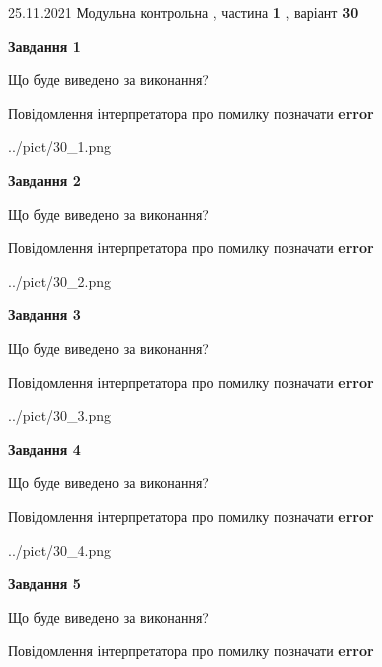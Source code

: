 \documentclass[10pt, ukrainian]{article}
\begin{document}
{25.11.2021 Модульна контрольна , частина \textbf { 1 }, варіант  \No \textbf { 30 }\par}
{
\begin {large}

{\begin {center}\textbf{Завдання 1}\end {center}}\par
Що буде виведено за виконання? \par
Повідомлення інтерпретатора про помилку позначати \textbf{error}

\begin{center}
	{../pict/30_1.png}
\end{center}
\newpage

{\begin {center}\textbf{Завдання 2}\end {center}}\par
Що буде виведено за виконання? \par
Повідомлення інтерпретатора про помилку позначати \textbf{error}

\begin{center}
	{../pict/30_2.png}
\end{center}
\newpage

{\begin {center}\textbf{Завдання 3}\end {center}}\par
Що буде виведено за виконання? \par
Повідомлення інтерпретатора про помилку позначати \textbf{error}

\begin{center}
	{../pict/30_3.png}
\end{center}
\newpage

{\begin {center}\textbf{Завдання 4}\end {center}}\par
Що буде виведено за виконання? \par
Повідомлення інтерпретатора про помилку позначати \textbf{error}

\begin{center}
	{../pict/30_4.png}
\end{center}
\newpage

{\begin {center}\textbf{Завдання 5}\end {center}}\par
Що буде виведено за виконання? \par
Повідомлення інтерпретатора про помилку позначати \textbf{error}


\end{large}}
\end{document}
